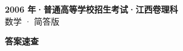 \documentclass[zihao=-4, a4paper]{ctexart}
\begin{document}
\begin{center}
  {\Large\bfseries 2006 年·普通高等学校招生考试·江西卷理科}\\[4pt]
  {\large 数学 · 简答版}
\end{center}
\medskip
{}

\clearpage
{}
\begin{center}{\Large\bfseries 答案速查}\end{center}
\medskip

\end{document}
